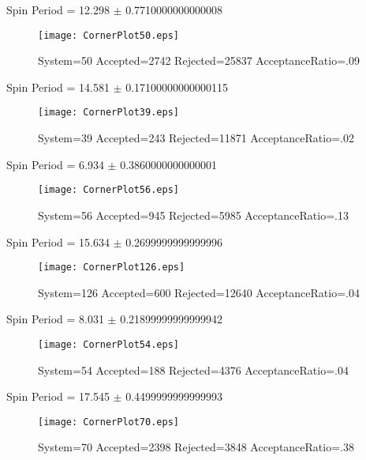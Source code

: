 \documentclass[10pt]{article}
\begin{document}
\newpage
\begin{center}
        Spin Period = 12.298 $\pm$ 0.7710000000000008
        \end{center}
\begin{figure}[H] 
        \texttt{[image: CornerPlot50.eps]}
        \caption{System=50 Accepted=2742 Rejected=25837 AcceptanceRatio=.09}
        \label{S50}
        \centering
        \end{figure}
\newpage
\begin{center}
        Spin Period = 14.581 $\pm$ 0.17100000000000115
        \end{center}
\begin{figure}[H] 
        \texttt{[image: CornerPlot39.eps]}
        \caption{System=39 Accepted=243 Rejected=11871 AcceptanceRatio=.02}
        \label{S39}
        \centering
        \end{figure}
\newpage
\begin{center}
        Spin Period = 6.934 $\pm$ 0.3860000000000001
        \end{center}
\begin{figure}[H] 
        \texttt{[image: CornerPlot56.eps]}
        \caption{System=56 Accepted=945 Rejected=5985 AcceptanceRatio=.13}
        \label{S56}
        \centering
        \end{figure}
\newpage
\begin{center}
        Spin Period = 15.634 $\pm$ 0.2699999999999996
        \end{center}
\begin{figure}[H] 
        \texttt{[image: CornerPlot126.eps]}
        \caption{System=126 Accepted=600 Rejected=12640 AcceptanceRatio=.04}
        \label{S126}
        \centering
        \end{figure}
\newpage
\begin{center}
        Spin Period = 8.031 $\pm$ 0.21899999999999942
        \end{center}
\begin{figure}[H] 
        \texttt{[image: CornerPlot54.eps]}
        \caption{System=54 Accepted=188 Rejected=4376 AcceptanceRatio=.04}
        \label{S54}
        \centering
        \end{figure}
\newpage
\begin{center}
        Spin Period = 17.545 $\pm$ 0.4499999999999993
        \end{center}
\begin{figure}[H] 
        \texttt{[image: CornerPlot70.eps]}
        \caption{System=70 Accepted=2398 Rejected=3848 AcceptanceRatio=.38}
        \label{S70}
        \centering
        \end{figure}
\end{document}
